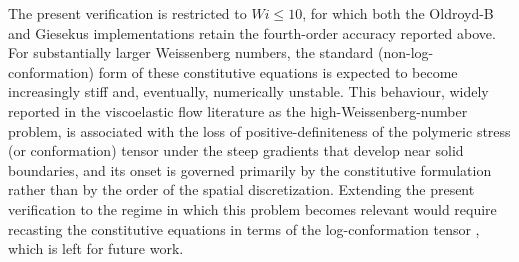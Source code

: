 \documentclass[preprint, 12pt]{elsarticle}
\begin{document}
The present verification is restricted to $Wi \leq 10$, for which both the Oldroyd-B and Giesekus implementations retain the fourth-order accuracy reported above. For substantially larger Weissenberg numbers, the standard (non-log-conformation) form of these constitutive equations is expected to become increasingly stiff and, eventually, numerically unstable. This behaviour, widely reported in the viscoelastic flow literature as the high-Weissenberg-number problem, is associated with the loss of positive-definiteness of the polymeric stress (or conformation) tensor under the steep gradients that develop near solid boundaries, and its onset is governed primarily by the constitutive formulation rather than by the order of the spatial discretization. Extending the present verification to the regime in which this problem becomes relevant would require recasting the constitutive equations in terms of the log-conformation tensor \citep{Fernandes2022}, which is left for future work.





\end{document}
